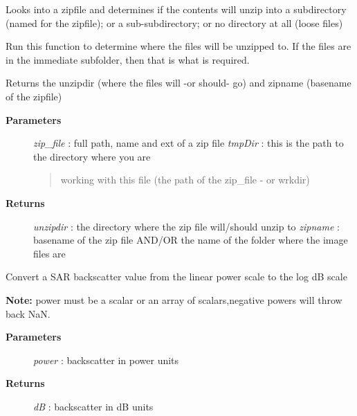 \documentclass[letterpaper,10pt,english]{sphinxmanual}
\begin{document}

\begin{fulllineitems}
\label{code:Util.getZipRoot}
Looks into a zipfile and determines if the contents will unzip into a subdirectory
(named for the zipfile); or a sub-subdirectory; or no directory at all (loose files)

Run this function to determine where the files will be unzipped to. If the files are in
the immediate subfolder, then that is what is required.

Returns the unzipdir (where the files will -or should- go) and zipname (basename of the zipfile)
\begin{description}
\item[{\textbf{Parameters}}] \leavevmode
\emph{zip\_file}  : full path, name and ext of a zip file
\emph{tmpDir}    : this is the path to the directory where you are
\begin{quote}

working with this file (the path of the zip\_file - or wrkdir)
\end{quote}

\item[{\textbf{Returns}}] \leavevmode
\emph{unzipdir}  : the directory where the zip file will/should unzip to
\emph{zipname}   : basename of the zip file AND/OR the name of the folder where the image files are

\end{description}

\end{fulllineitems}


\begin{fulllineitems}
\label{code:Util.getdBScale}
Convert a SAR backscatter value from the linear power scale to the log dB scale

\textbf{Note:} power must be a scalar or an array of scalars,negative powers will throw back NaN.
\begin{description}
\item[{\textbf{Parameters}}] \leavevmode
\emph{power}     :  backscatter in power units

\item[{\textbf{Returns}}] \leavevmode
\emph{dB}   :  backscatter in dB units

\end{description}

\end{fulllineitems}
\end{document}
